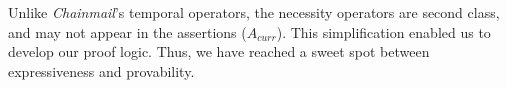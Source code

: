   
  \vspace{.02in}
  
Unlike  \emph{Chainmail}'s temporal operators, 
 the necessity operators %
 are second class, and may not appear in the assertions  {(\eg  ${A_{curr}}$)}. 
 This simplification enabled us to develop our proof logic. 
 Thus, we {have reached} a  sweet spot between expressiveness and 
 provability.
 





 



